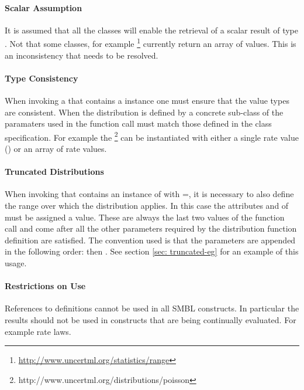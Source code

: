 \documentclass[draftspec]{sbmlpkgspec}
\begin{document}
\paragraph{Scalar Assumption}

It is assumed \contraversial that all the \uncertml classes will enable
the retrieval of a scalar result of type . Not that
some \uncertml classes, for example
\footnote{\url{http://www.uncertml.org/statistics/range}}
currently return an array of values. This is an inconsistency that
needs to be resolved.

\paragraph{Type Consistency}

When invoking a \FunctionDefinition that contains a \Distribution
instance one must ensure that the value types are consistent. When the
distribution is defined by a concrete sub-class of \unidistrib the
paramaters used in the function call must match those defined in the
\uncertml class specification. For example the
\footnote{http://www.uncertml.org/distributions/poisson}
can be instantiated with either a single rate value
() or an array of rate values.

\paragraph{Truncated Distributions}

When invoking \FunctionDefinition that contains an instance of
\Distribution with =\value{true}, it is necessary to
also define the range over which the distribution applies. In this
\contraversial case the attributes  and
 of \Distribution must be assigned a value. These
are always the last two values of the function call and come after all
the other parameters required by the distribution function definition
are satisfied. The convention used is that the parameters are appended
in the following order:  then .
See section \vref{sec: truncated-eg} for an example of this usage.

\paragraph{Restrictions on Use}

References to definitions cannot be used in all SMBL constructs. In
particular the results should not be used in constructs that are being continually
evaluated. For example rate laws.
\end{document}
